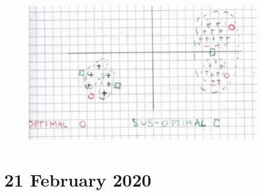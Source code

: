 \documentclass[a4paper,11pt,oneside]{book}
\begin{document}
    \begin{solution}
        \begin{figure}[H]
        \centering
        \includegraphics[width=0.9\textwidth]{images/2_4_29_June_2020.png}
        \end{figure}
    \end{solution}


\chapter{21 February 2020}
\end{document}
